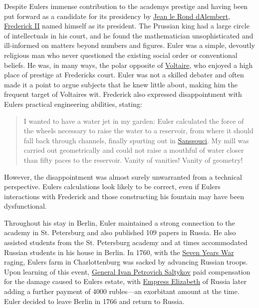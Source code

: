 Despite Euler\textquotesingle s immense contribution to the academy\textquotesingle s prestige and having been put forward as a candidate for its presidency by \href{https://en.wikipedia.org/wiki/Jean_le_Rond_d'Alembert}{Jean le Rond d\textquotesingle Alembert}, \href{https://en.wikipedia.org/wiki/Frederick_II_of_Prussia}{Frederick II} named himself as its president. The Prussian king had a large circle of intellectuals in his court, and he found the mathematician unsophisticated and ill-informed on matters beyond numbers and figures. Euler was a simple, devoutly religious man who never questioned the existing social order or conventional beliefs. He was, in many ways, the polar opposite of \href{https://en.wikipedia.org/wiki/Voltaire}{Voltaire}, who enjoyed a high place of prestige at Frederick\textquotesingle s court. Euler was not a skilled debater and often made it a point to argue subjects that he knew little about, making him the frequent target of Voltaire\textquotesingle s wit. Frederick also expressed disappointment with Euler\textquotesingle s practical engineering abilities, stating:

\begin{quote}
I wanted to have a water jet in my garden: Euler calculated the force of the wheels necessary to raise the water to a reservoir, from where it should fall back through channels, finally spurting out in \href{https://en.wikipedia.org/wiki/Sanssouci}{Sanssouci}. My mill was carried out geometrically and could not raise a mouthful of water closer than fifty paces to the reservoir. Vanity of vanities! Vanity of geometry!
\end{quote}

However, the disappointment was almost surely unwarranted from a technical perspective. Euler\textquotesingle s calculations look likely to be correct, even if Euler\textquotesingle s interactions with Frederick and those constructing his fountain may have been dysfunctional.

Throughout his stay in Berlin, Euler maintained a strong connection to the academy in St. Petersburg and also published 109 papers in Russia. He also assisted students from the St. Petersburg academy and at times accommodated Russian students in his house in Berlin. In 1760, with the \href{https://en.wikipedia.org/wiki/Seven_Years'_War}{Seven Years\textquotesingle{} War} raging, Euler\textquotesingle s farm in Charlottenburg was sacked by advancing Russian troops. Upon learning of this event, \href{https://en.wikipedia.org/wiki/Ivan_Saltykov}{General Ivan Petrovich Saltykov} paid compensation for the damage caused to Euler\textquotesingle s estate, with \href{https://en.wikipedia.org/wiki/Empress_Elizabeth}{Empress Elizabeth} of Russia later adding a further payment of 4000 rubles---an exorbitant amount at the time. Euler decided to leave Berlin in 1766 and return to Russia.

